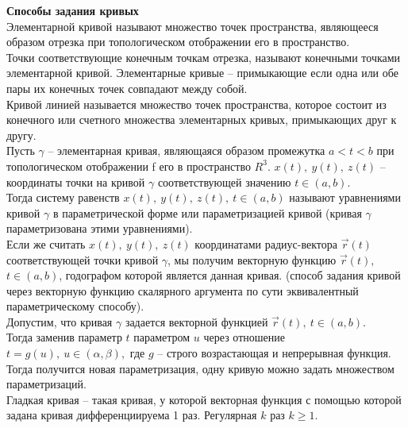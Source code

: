 \documentclass{report}
\begin{document}
\noindent
\textbf{Способы задания кривых}\\
\indent Элементарной кривой называют множество точек пространства, являющееся
образом отрезка при топологическом отображении его в пространство.\\
Точки соответствующие конечным точкам отрезка, называют конечными точками
элементарной кривой. Элементарные кривые -- примыкающие если одна или обе
пары их конечных точек совпадают между собой.\\
Кривой линией называется множество точек пространства, которое состоит
из конечного или счетного множества элементарных кривых, примыкающих друг к другу.\\
\indent Пусть $\gamma$ -- элементарная кривая, являющаяся образом промежутка 
$a < t < b$ при топологическом отображении f его в пространство $R^{3}$.
$x(t),\ y(t),\ z(t)$ -- координаты точки на кривой $\gamma$ соответствующей
значению $t \in (a, b)$.\\
Тогда систему равенств $x(t),\ y(t),\ z(t),\ t \in (a, b)$ называют уравнениями кривой 
$\gamma$ в параметрической форме или параметризацией кривой (кривая $\gamma$ параметризована
этими уравнениями).\\
Если же считать $x(t),\ y(t),\ z(t)$ координатами радиус-вектора $\overrightarrow{r}(t)$
соответствующей точки кривой $\gamma$, мы получим векторную функцию $\overrightarrow{r}(t),\ $
$t \in (a, b)$, годографом которой является данная кривая. (способ задания кривой через векторную
функцию скалярного аргумента по сути эквивалентный параметрическому способу).\\
Допустим, что кривая $\gamma$ задается векторной функцией $\overrightarrow{r}(t),\ t \in (a, b)$.\\
Тогда заменив параметр $t$ параметром $u$ через отношение $t = g(u),\ u \in (\alpha, \beta),$ где $g$
-- строго возрастающая и непрерывная функция. Тогда получится новая параметризация, одну кривую
можно задать множеством параметризаций.\\
Гладкая кривая -- такая кривая, у которой векторная функция
с помощью которой задана кривая дифференциируема 1 раз.
Регулярная $k$ раз $k \geq 1$.\\
\end{document}
